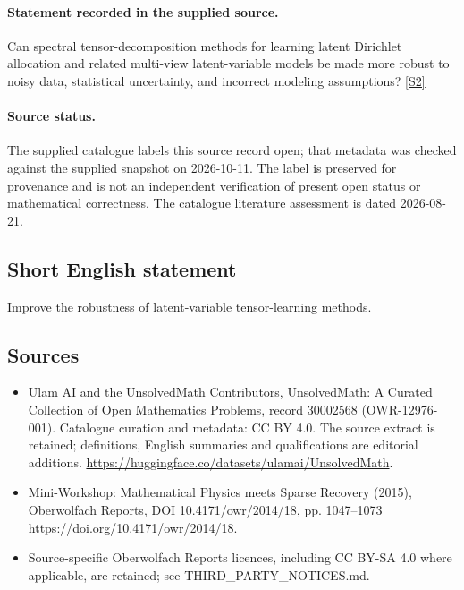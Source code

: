 \documentclass[11pt]{article}
\begin{document}
\paragraph{Statement recorded in the supplied source.}
Can spectral tensor-decomposition methods for learning latent Dirichlet allocation and related multi-view latent-variable models be made more robust to noisy data, statistical uncertainty, and incorrect modeling assumptions? \href{https://doi.org/10.4171/owr/2014/18}{[S2]}
\paragraph{Source status.}
The supplied catalogue labels this source record open; that metadata was checked against the supplied snapshot on 2026-10-11. The label is preserved for provenance and is not an independent verification of present open status or mathematical correctness. The catalogue literature assessment is dated 2026-08-21.
\subsection{Short English statement}
Improve the robustness of latent-variable tensor-learning methods.
\subsection{Sources}
\begin{itemize}
\item[S1] Ulam AI and the UnsolvedMath Contributors, UnsolvedMath: A Curated Collection of Open Mathematics Problems, record 30002568 (OWR-12976-001). Catalogue curation and metadata: CC BY 4.0. The source extract is retained; definitions, English summaries and qualifications are editorial additions.
\url{https://huggingface.co/datasets/ulamai/UnsolvedMath}.
\item[S2] Mini-Workshop: Mathematical Physics meets Sparse Recovery (2015), Oberwolfach Reports, DOI 10.4171/owr/2014/18, pp. 1047--1073
\url{https://doi.org/10.4171/owr/2014/18}.
\item Source-specific Oberwolfach Reports licences, including CC BY-SA 4.0 where applicable, are retained; see THIRD\_PARTY\_NOTICES.md.
\end{itemize}
\end{document}
